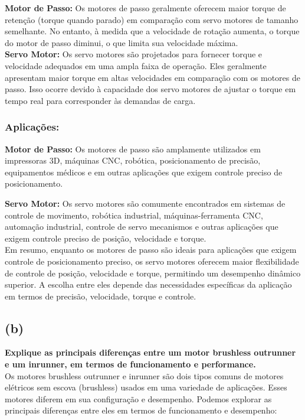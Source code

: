 \documentclass[a4paper, 12pt]{article}
\begin{document}
\textbf{Motor de Passo:} Os motores de passo geralmente oferecem maior torque de retenção (torque quando parado) em comparação com servo motores de tamanho semelhante. No entanto, à medida que a velocidade de rotação aumenta, o torque do motor de passo diminui, o que limita sua velocidade máxima.\\

\textbf{Servo Motor:} Os servo motores são projetados para fornecer torque e velocidade adequados em uma ampla faixa de operação. Eles geralmente apresentam maior torque em altas velocidades em comparação com os motores de passo. Isso ocorre devido à capacidade dos servo motores de ajustar o torque em tempo real para corresponder às demandas de carga.\\

\subsubsection{Aplicações:}

\textbf{Motor de Passo:} Os motores de passo são amplamente utilizados em impressoras 3D, máquinas CNC, robótica, posicionamento de precisão, equipamentos médicos e em outras aplicações que exigem controle preciso de posicionamento.

\textbf{Servo Motor:} Os servo motores são comumente encontrados em sistemas de controle de movimento, robótica industrial, máquinas-ferramenta CNC, automação industrial, controle de servo mecanismos e outras aplicações que exigem controle preciso de posição, velocidade e torque.\\

Em resumo, enquanto os motores de passo são ideais para aplicações que exigem controle de posicionamento preciso, os servo motores oferecem maior flexibilidade de controle de posição, velocidade e torque, permitindo um desempenho dinâmico superior. A escolha entre eles depende das necessidades específicas da aplicação em termos de precisão, velocidade, torque e controle.\\


\subsection{(b)}
\textbf{Explique as principais diferenças entre um motor brushless outrunner e um inrunner, em termos de funcionamento e performance.}\\

Os motores brushless outrunner e inrunner são dois tipos comuns de motores elétricos sem escova (brushless) usados em uma variedade de aplicações. Esses motores diferem em sua configuração e desempenho. Podemos explorar as principais diferenças entre eles em termos de funcionamento e desempenho:
\end{document}
